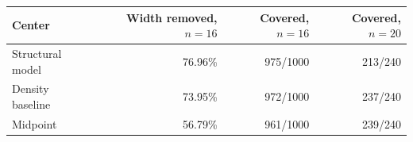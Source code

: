 \begin{tabular}{lrrr}
\toprule
Center & Width removed, $n=16$ & Covered, $n=16$ & Covered, $n=20$\\
\midrule
Structural model & 76.96\% & 975/1000 & 213/240\\
Density baseline & 73.95\% & 972/1000 & 237/240\\
Midpoint & 56.79\% & 961/1000 & 239/240\\
\bottomrule
\end{tabular}
